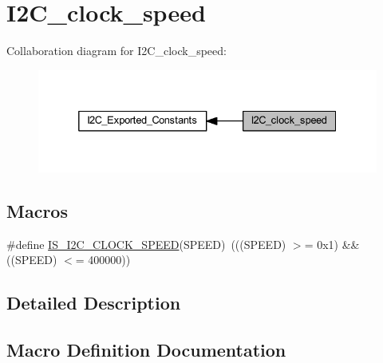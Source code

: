 \hypertarget{group___i2_c__clock__speed}{}\section{I2\+C\+\_\+clock\+\_\+speed}
\label{group___i2_c__clock__speed}
Collaboration diagram for I2\+C\+\_\+clock\+\_\+speed\+:
\nopagebreak
\begin{figure}[H]
\begin{center}
\leavevmode
\includegraphics[width=332pt]{group___i2_c__clock__speed}
\end{center}
\end{figure}
\subsection*{Macros}
\begin{DoxyCompactItemize}
\item 
\#define \hyperlink{group___i2_c__clock__speed_gae0d731df1b264d853703716c29309b9b}{I\+S\+\_\+\+I2\+C\+\_\+\+C\+L\+O\+C\+K\+\_\+\+S\+P\+E\+ED}(S\+P\+E\+ED)~(((S\+P\+E\+ED) $>$= 0x1) \&\& ((\+S\+P\+E\+E\+D) $<$= 400000))
\end{DoxyCompactItemize}


\subsection{Detailed Description}


\subsection{Macro Definition Documentation}
\mbox{\label{group___i2_c__clock__speed_gae0d731df1b264d853703716c29309b9b}} 
